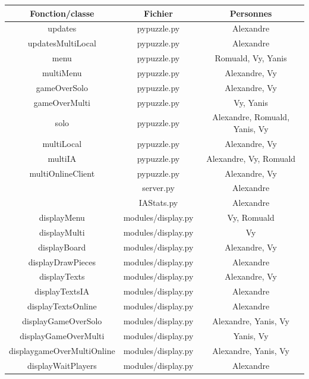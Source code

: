 \documentclass[a4paper]{report}
\begin{document}
\begin{center}
\begin{tabular}{|c|c|c|}\hline   
Fonction/classe				&Fichier		  			&Personnes \\ \hline\hline
updates&      				pypuzzle.py&      			Alexandre\\\hline
updatesMultiLocal&     		pypuzzle.py&      			Alexandre\\\hline
menu&      					pypuzzle.py&      			Romuald, Vy, Yanis\\\hline
multiMenu&      			pypuzzle.py&      			Alexandre, Vy\\\hline
gameOverSolo&      			pypuzzle.py&      			Alexandre, Vy\\\hline
gameOverMulti&      		pypuzzle.py&      			Vy, Yanis\\\hline
solo&      					pypuzzle.py&      			Alexandre, Romuald, Yanis, Vy\\\hline
multiLocal&      			pypuzzle.py&      			Alexandre, Vy\\\hline
multiIA&      				pypuzzle.py&      			Alexandre, Vy, Romuald\\\hline
multiOnlineClient&      	pypuzzle.py&				Alexandre, Vy\\\hline
&      						server.py&     				Alexandre\\\hline
&							IAStats.py&					Alexandre \\\hline
displayMenu&      			modules/display.py&      	Vy, Romuald\\\hline
displayMulti&      			modules/display.py&      	Vy\\\hline
displayBoard&      			modules/display.py&      	Alexandre, Vy\\\hline
displayDrawPieces&      	modules/display.py&      	Alexandre\\\hline
displayTexts&      			modules/display.py&      	Alexandre, Vy\\\hline
displayTextsIA&      		modules/display.py&      	Alexandre\\\hline
displayTextsOnline&      	modules/display.py&      	Alexandre\\\hline
displayGameOverSolo&      	modules/display.py&      	Alexandre, Yanis, Vy\\\hline
displayGameOverMulti&      	modules/display.py&      	Yanis, Vy\\\hline
displaygameOverMultiOnline& modules/display.py&      	Alexandre, Yanis, Vy\\\hline
displayWaitPlayers&      	modules/display.py&      	Alexandre\\\hline

\end{tabular}
\end{center}
\end{document}
